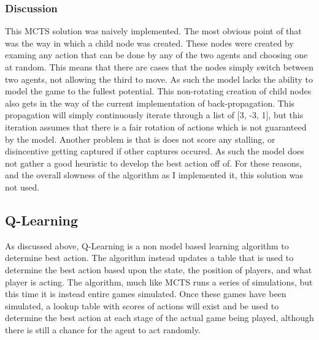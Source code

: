 \documentclass[letterpaper, 10 pt, conference]{ieeeconf}   %
\begin{document}
\subsubsection{Discussion}
This MCTS solution was naively implemented. The most obvious point of that was the way in which a child node was created. These nodes
were created by examing any action that can be done by any of the two agents and choosing one at random. This means that there are cases that the nodes simply switch between two agents,
not allowing the third to move. As such the model lacks the ability to model the game to the fullest potential. This non-rotating creation of child nodes also
gets in the way of the current implementation of back-propagation. This propagation will simply continuously iterate through a list of [3, -3, 1], but this iteration
assumes that there is a fair rotation of actions which is not guaranteed by the model. Another problem is that is does not score any stalling, or disincentive getting captured if
other captures occured. As such the model does not gather a good heuristic to develop the best action off of. For these reasons, and the overall slowness of the algorithm as
I implemented it, this solution was not used.

\subsection{Q-Learning}
As discussed above, Q-Learning is a non model based learning algorithm to determine best action. The algorithm instead
updates a table that is used to determine the best action based upon the state, the position of players, and what player is acting.
The algorithm, much like MCTS runs a series of simulations, but this time it is instead entire games simulated.
Once these games have been simulated, a lookup table with scores of actions will exist and be used to determine the best action
at each stage of the actual game being played, although there is still a chance for the agent to act randomly.
\end{document}
